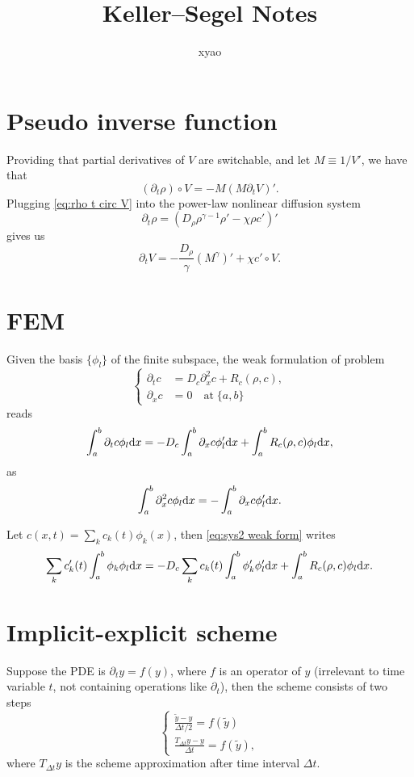 \documentclass{article}
\title{Keller--Segel Notes}
\author{xyao}
\begin{document}
  \maketitle
  \section{Pseudo inverse function}
  Providing that partial derivatives of $V$ are switchable, and let $M\equiv 1 / V'$, we have that
  \begin{equation}
    \label{eq:rho t circ V}
    (\partial_t\rho)\circ V = -M(M\partial_t V)'.
  \end{equation}
  Plugging \cref{eq:rho t circ V} into the power-law nonlinear diffusion system
  \[
    \partial_t \rho = \left(D_{\rho}\rho^{\gamma - 1}\rho' - \chi\rho c'\right)'
  \]
  gives us
  \[
    \partial_t V = -\frac{D_\rho}{\gamma}(M^\gamma)' + \chi c'\circ V.
  \]

  \section{FEM}
  Given the basis $\{\phi_l\}$ of the finite subspace, the weak formulation of problem
  \[
    \left\{
      \begin{aligned}
        \partial_t c &= D_c \partial_x^2 c + R_c(\rho, c), \\
        \partial_x c &= 0\quad\text{at}\;\{a,b\}
      \end{aligned}
    \right.
  \]
  reads
  \begin{equation}
    \label{eq:sys2 weak form}
    \int_a^b \partial_t c \phi_l\mathrm d x = - D_c\int_a^b \partial_x c\phi_l'\mathrm d x
                                          + \int_a^b R_c(\rho, c)\phi_l\mathrm d x,
  \end{equation}
  as
  \[
    \int_a^b \partial^2_x c\phi_l \mathrm d x = - \int_a^b \partial_x c\phi_l'\mathrm d x.
  \]

  Let $c(x, t) = \sum_k c_k(t)\phi_k(x)$, then \cref{eq:sys2 weak form} writes
  \[
    \sum_k c'_k(t)\int_a^b\phi_k\phi_l\mathrm d x = - D_c\sum_k c_k(t)\int_a^b\phi_k'\phi_l'\mathrm d x
                                                + \int_a^b R_c(\rho, c)\phi_l\mathrm d x.
  \]

  \section{Implicit-explicit scheme}
  Suppose the PDE is $\partial_t y = f(y)$, where $f$ is an operator of $y$ (irrelevant to time
  variable $t$, not containing operations like $\partial_t$), then the scheme consists of two steps
  \[
    \left\{
      \begin{aligned}
        \frac{\tilde y - y}{\Delta t / 2} = f(\tilde y)\\
        \frac{T_{\Delta t}y - y}{\Delta t} = f(\tilde y),
      \end{aligned}
    \right.
  \]
  where $T_{\Delta t}y$ is the scheme approximation after time interval $\Delta t$.
\end{document}
